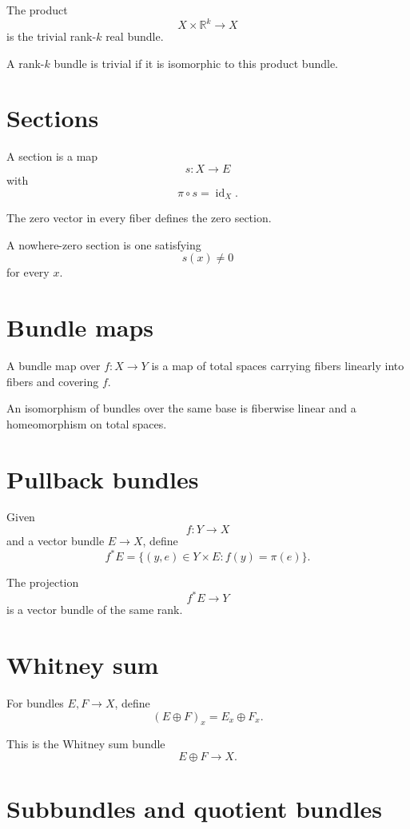 The product
\[
X\times\mathbb R^k\to X
\]
is the trivial rank-\(k\) real bundle.

A rank-\(k\) bundle is trivial if it is isomorphic to this product bundle.

\section{Sections}

\begin{definition}[Section]
\label{def:viii30-section}
A section is a map
\[
s:X\to E
\]
with
\[
\pi\circ s=\operatorname{id}_X.
\]
\end{definition}

The zero vector in every fiber defines the zero section.

A nowhere-zero section is one satisfying
\[
s(x)\ne0
\]
for every \(x\).

\section{Bundle maps}

A bundle map over \(f:X\to Y\) is a map of total spaces carrying fibers
linearly into fibers and covering \(f\).

An isomorphism of bundles over the same base is fiberwise linear and a
homeomorphism on total spaces.

\section{Pullback bundles}

Given
\[
f:Y\to X
\]
and a vector bundle \(E\to X\), define
\[
f^*E
=
\{(y,e)\in Y\times E:f(y)=\pi(e)\}.
\]

\begin{theorem}[Pullback]
\label{thm:viii30-pullback}
The projection
\[
f^*E\to Y
\]
is a vector bundle of the same rank.
\end{theorem}

\section{Whitney sum}

For bundles \(E,F\to X\), define
\[
(E\oplus F)_x=E_x\oplus F_x.
\]

This is the Whitney sum bundle
\[
E\oplus F\to X.
\]

\section{Subbundles and quotient bundles}

